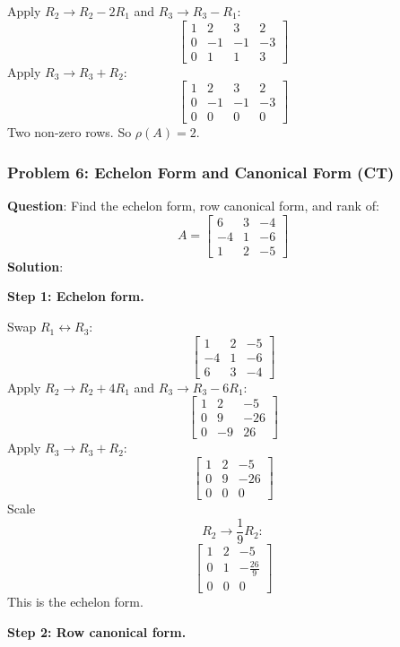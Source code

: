 \documentclass[
]{article}
\begin{document}
Apply \(R_2 \to R_2 - 2R_1\) and \(R_3 \to R_3 - R_1\):
\[
\begin{bmatrix}
1 & 2 & 3 & 2 \\
0 & -1 & -1 & -3 \\
0 & 1 & 1 & 3
\end{bmatrix}
\]
Apply \(R_3 \to R_3 + R_2\):
\[
\begin{bmatrix}
1 & 2 & 3 & 2 \\
0 & -1 & -1 & -3 \\
0 & 0 & 0 & 0
\end{bmatrix}
\]
Two non-zero rows. So \(\rho(A) = 2\).

\subsubsection{Problem 6: Echelon Form and Canonical Form
(CT)}\label{problem-6-echelon-form-and-canonical-form-ct}

\textbf{Question}: Find the echelon form, row canonical form, and rank
of:
\[
A =
\begin{bmatrix}
6 & 3 & -4 \\
-4 & 1 & -6 \\
1 & 2 & -5
\end{bmatrix}
\]
\textbf{Solution}:

\textbf{Step 1: Echelon form.}

Swap \(R_1 \leftrightarrow R_3\):
\[
\begin{bmatrix}
1 & 2 & -5 \\
-4 & 1 & -6 \\
6 & 3 & -4
\end{bmatrix}
\]
Apply \(R_2 \to R_2 + 4R_1\) and \(R_3 \to R_3 - 6R_1\):
\[
\begin{bmatrix}
1 & 2 & -5 \\
0 & 9 & -26 \\
0 & -9 & 26
\end{bmatrix}
\]
Apply \(R_3 \to R_3 + R_2\):
\[
\begin{bmatrix}
1 & 2 & -5 \\
0 & 9 & -26 \\
0 & 0 & 0
\end{bmatrix}
\]
Scale
\[
R_2 \to \frac{1}{9}R_2:
\]
\[
\begin{bmatrix}
1 & 2 & -5 \\
0 & 1 & -\frac{26}{9} \\
0 & 0 & 0
\end{bmatrix}
\]
This is the echelon form.

\textbf{Step 2: Row canonical form.}
\end{document}
